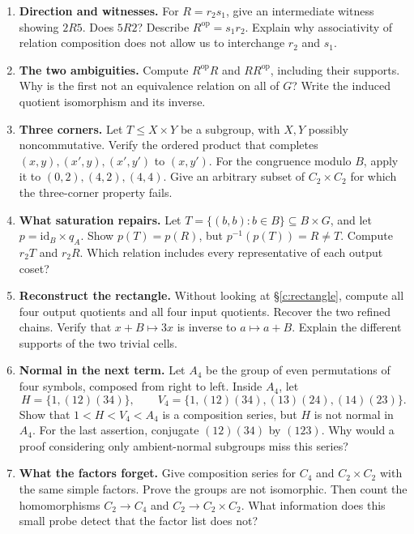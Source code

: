 \documentclass[11pt]{article}
\newcommand{\id}{\mathrm{id}}
\newcommand{\op}{\mathrm{op}}
\begin{document}
\begin{enumerate}
\item \textbf{Direction and witnesses.}
For \(R=r_2s_1\), give an intermediate witness showing \(2R5\).
Does \(5R2\)? Describe \(R^\op=s_1r_2\).
Explain why associativity of relation composition does not allow us
to interchange \(r_2\) and \(s_1\).

\item \textbf{The two ambiguities.}
Compute \(R^\op R\) and \(RR^\op\), including their supports.
Why is the first not an equivalence relation on all of \(G\)?
Write the induced quotient isomorphism and its inverse.

\item \textbf{Three corners.}
Let \(T\leq X\times Y\) be a subgroup, with \(X,Y\) possibly
noncommutative. Verify the ordered product that completes
\((x,y),(x',y),(x',y')\) to \((x,y')\).
For the congruence modulo \(B\), apply it to
\((0,2),(4,2),(4,4)\).
Give an arbitrary subset of \(C_2\times C_2\) for which the
three-corner property fails.

\item \textbf{What saturation repairs.}
Let \(T=\{(b,b):b\in B\}\subseteq B\times G\), and let
\(p=\id_B\times q_A\).
Show \(p(T)=p(R)\), but \(p^{-1}(p(T))=R\ne T\).
Compute \(r_2T\) and \(r_2R\). Which relation includes every representative
of each output coset?

\item \textbf{Reconstruct the rectangle.}
Without looking at §\ref{c:rectangle}, compute all four output quotients
and all four input quotients. Recover the two refined chains.
Verify that \(x+B\mapsto3x\) is inverse to \(a\mapsto a+B\).
Explain the different supports of the two trivial cells.

\item \textbf{Normal in the next term.}
Let \(A_4\) be the group of even permutations of four symbols, composed
from right to left. Inside \(A_4\), let
\[
 H=\{1,(12)(34)\},\qquad
 V_4=\{1,(12)(34),(13)(24),(14)(23)\}.
\]
Show that \(1<H<V_4<A_4\) is a composition series, but
\(H\) is not normal in \(A_4\).
For the last assertion, conjugate \((12)(34)\) by \((123)\).
Why would a proof considering only ambient-normal subgroups miss this
series?

\item \textbf{What the factors forget.}
Give composition series for \(C_4\) and \(C_2\times C_2\) with the same
simple factors. Prove the groups are not isomorphic.
Then count the homomorphisms \(C_2\to C_4\) and
\(C_2\to C_2\times C_2\). What information does this small probe detect
that the factor list does not?
\end{enumerate}
\end{document}
